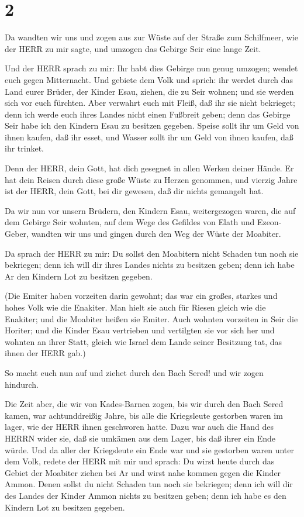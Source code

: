 \hypertarget{section-1}{%
\section{2}\label{section-1}}

 Da wandten wir uns und zogen aus zur Wüste auf der Straße
zum Schilfmeer, wie der HERR zu mir sagte, und umzogen das Gebirge Seir
eine lange Zeit.

 Und der HERR sprach zu mir:  Ihr habt dies
Gebirge nun genug umzogen; wendet euch gegen Mitternacht. 
Und gebiete dem Volk und sprich: ihr werdet durch das Land eurer Brüder,
der Kinder Esau, ziehen, die zu Seir wohnen; und sie werden sich vor
euch fürchten. Aber verwahrt euch mit Fleiß,  daß ihr sie
nicht bekrieget; denn ich werde euch ihres Landes nicht einen Fußbreit
geben; denn das Gebirge Seir habe ich den Kindern Esau zu besitzen
gegeben.  Speise sollt ihr um Geld von ihnen kaufen, daß ihr
esset, und Wasser sollt ihr um Geld von ihnen kaufen, daß ihr trinket.

 Denn der HERR, dein Gott, hat dich gesegnet in allen Werken
deiner Hände. Er hat dein Reisen durch diese große Wüste zu Herzen
genommen, und vierzig Jahre ist der HERR, dein Gott, bei dir gewesen,
daß dir nichts gemangelt hat.

 Da wir nun vor unsern Brüdern, den Kindern Esau,
weitergezogen waren, die auf dem Gebirge Seir wohnten, auf dem Wege des
Gefildes von Elath und Ezeon-Geber, wandten wir uns und gingen durch den
Weg der Wüste der Moabiter.

 Da sprach der HERR zu mir: Du sollst den Moabitern nicht
Schaden tun noch sie bekriegen; denn ich will dir ihres Landes nichts zu
besitzen geben; denn ich habe Ar den Kindern Lot zu besitzen gegeben.

 (Die Emiter haben vorzeiten darin gewohnt; das war ein
großes, starkes und hohes Volk wie die Enakiter.  Man hielt
sie auch für Riesen gleich wie die Enakiter; und die Moabiter heißen sie
Emiter.  Auch wohnten vorzeiten in Seir die Horiter; und
die Kinder Esau vertrieben und vertilgten sie vor sich her und wohnten
an ihrer Statt, gleich wie Israel dem Lande seiner Besitzung tat, das
ihnen der HERR gab.)

 So macht euch nun auf und ziehet durch den Bach Sered! und
wir zogen hindurch.

 Die Zeit aber, die wir von Kades-Barnea zogen, bis wir
durch den Bach Sered kamen, war achtunddreißig Jahre, bis alle die
Kriegsleute gestorben waren im lager, wie der HERR ihnen geschworen
hatte.  Dazu war auch die Hand des HERRN wider sie, daß sie
umkämen aus dem Lager, bis daß ihrer ein Ende würde.  Und
da aller der Kriegsleute ein Ende war und sie gestorben waren unter dem
Volk,  redete der HERR mit mir und sprach:  Du
wirst heute durch das Gebiet der Moabiter ziehen bei Ar 
und wirst nahe kommen gegen die Kinder Ammon. Denen sollst du nicht
Schaden tun noch sie bekriegen; denn ich will dir des Landes der Kinder
Ammon nichts zu besitzen geben; denn ich habe es den Kindern Lot zu
besitzen gegeben.

